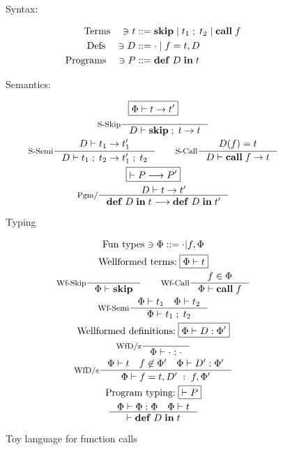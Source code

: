 \documentclass[a4paper, oneside, 10pt, draft]{memoir}
\begin{document}
\newcommand{\fskip}{\mathbf{skip}}
\newcommand{\fsemi}[2]{#1 \; ; \; #2}
\newcommand{\fcall}[1]{\mathbf{call} \; #1}
\newcommand{\fpgm}[2]{\mathbf{def} \; #1 \; \mathbf{in} \; #2}
\begin{figure}
  \begin{center}
    Syntax:
  \end{center}
  \begin{align*}
    \text{Terms} \quad \ni t & ::= \fskip{} \bor \fsemi{t_1}{t_2} \bor
    \fcall{f}\\
    \text{Defs} \quad \ni D & ::= \cdot \bor f = t, D\\
    \text{Programs} \quad \ni P & ::= \fpgm{D}{t}
  \end{align*}
  \begin{center}
    Semantics:
  \end{center}
  \begin{gather*}
    \boxed{\Phi |- t -> t'}\\
    \inference[S-Skip]{}{D |- \fsemi{\fskip{}}{t} -> t}\\
    \inference[S-Semi]{D |- t_1 -> t'_1}{D |- \fsemi{t_1}{t_2}
      -> \fsemi{t'_1}{t_2}} \quad \quad
    \inference[S-Call]{D(f) = t}{D |- \fcall{f} -> t}\\
    \boxed{|- P --> P'}\\
    \inference[Pgm/]{D |- t -> t'}{\fpgm{D}{t} --> \fpgm{D}{t'}}
  \end{gather*}
  \begin{center}
    Typing
  \end{center}
  \begin{gather*}
    \text{Fun types} \ni \Phi ::= \cdot | f,\Phi\\
    \text{Wellformed terms:} \; \boxed{\Phi |- t}\\
    \inference[Wf-Skip]{}{\Phi |- \fskip{}} \quad \quad
    \inference[Wf-Call]{f \in \Phi}{\Phi |- \fcall{f}}\\
    \inference[Wf-Semi]{\Phi |- t_1 \quad \Phi |- t_2}{\Phi |-
      \fsemi{t_1}{t_2}}\\
    \text{Wellformed definitions:} \; \boxed{\Phi |- D :
      \Phi'}\\
    \inference[WfD/z]{}{\Phi |- \cdot : \cdot}\\
    \inference[WfD/s]{\Phi |- t \quad f \not \in \Phi' \quad
      \Phi |- D' : \Phi'}{\Phi |- f = t, D' \; : \;
      f,\Phi'}\\
    \text{Program typing:} \; \boxed{|- P}\\
    \inference{\Phi |- \Phi : \Phi \quad \Phi |- t}{|- \fpgm{D}{t}}
  \end{gather*}
  \caption{Toy language for function calls}
  \label{fig:func-call-lang}
\end{figure}
\end{document}
